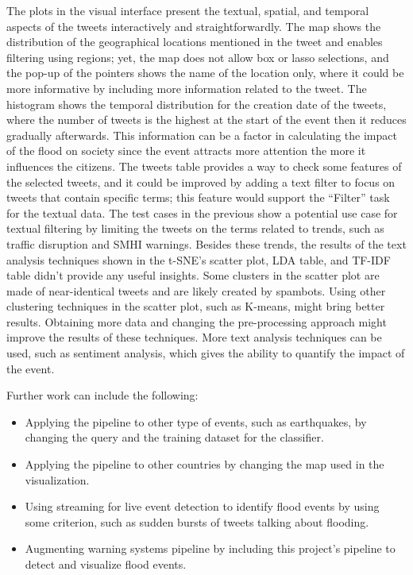 The plots in the visual interface present the textual, spatial, and temporal aspects of the tweets
interactively and straightforwardly. The map shows the distribution of the geographical locations
mentioned in the tweet and enables filtering using regions; yet, the map does not allow box or lasso
selections, and the pop-up of the pointers shows the name of the location only, where it could be
more informative by including more information related to the tweet. The histogram shows the
temporal distribution for the creation date of the tweets, where the number of tweets is the highest
at the start of the event then it reduces gradually afterwards. This information can be a factor in
calculating the impact of the flood on society since the event attracts more attention the more it
influences the citizens. The tweets table provides a way to check some features of the selected
tweets, and it could be improved by adding a text filter to focus on tweets that contain specific
terms; this feature would support the ``Filter'' task for the textual data. The test cases in the
previous show a potential use case for textual filtering by limiting the tweets on the terms related
to trends, such as traffic disruption and \ac{SMHI} warnings. Besides these trends, the results of
the text analysis techniques shown in the \ac{t-SNE}'s scatter plot, \ac{LDA} table, and \ac{TF-IDF}
table didn't provide any useful insights. Some clusters in the scatter plot are made of
near-identical tweets and are likely created by spambots. Using other clustering techniques in the
scatter plot, such as K-means, might bring better results. Obtaining more data and changing the
pre-processing approach might improve the results of these techniques. More text analysis techniques
can be used, such as sentiment analysis, which gives the ability to quantify the impact of the
event.

Further work can include the following:
\begin{itemize}
  \item Applying the pipeline to other type of events, such as earthquakes, by changing the query
    and the training dataset for the classifier.
  \item Applying the pipeline to other countries by changing the map used in the visualization.
  \item Using streaming for live event detection to identify flood events by using some criterion,
    such as sudden bursts of tweets talking about flooding.
  \item Augmenting warning systems pipeline by including this project's pipeline to detect and visualize flood events.
\end{itemize}
